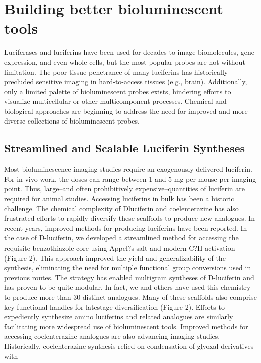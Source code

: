 \section{Building better bioluminescent tools}
Luciferases and luciferins have been used for decades to image
biomolecules, gene expression, and even whole cells, but the
most popular probes are not without limitation.\cite{RN26} The poor
tissue penetrance of many luciferins has historically precluded
sensitive imaging in hard-to-access tissues (e.g., brain).
Additionally, only a limited palette of bioluminescent probes
exists, hindering efforts to visualize multicellular or other
multicomponent processes. Chemical and biological approaches
are beginning to address the need for improved and
more diverse collections of bioluminescent probes.
\subsection*{Streamlined and Scalable Luciferin Syntheses} 
Most bioluminescence imaging studies require an exogenously
delivered luciferin. For in vivo work, the doses can range
between 1 and 5 mg per mouse per imaging point. Thus,
large--and often prohibitively expensive--quantities of luciferin
are required for animal studies. Accessing luciferins in bulk
has been a historic challenge. The chemical complexity of Dluciferin
and coelenterazine has also frustrated efforts to rapidly
diversify these scaffolds to produce new analogues.
In recent years, improved methods for producing luciferins
have been reported. In the case of D-luciferin, we developed a
streamlined method for accessing the requisite benzothiazole
core using Appel?s salt and modern C?H activation (Figure
2).\cite{McCutcheon:2012ixb} This approach improved the yield and generalizability of
the synthesis, eliminating the need for multiple functional
group conversions used in previous routes. The strategy has
enabled multigram syntheses of D-luciferin and has proven to
be quite modular. In fact, we and others have used this
chemistry to produce more than 30 distinct analogues.\cite{Woodroofe:2012vx} Many
of these scaffolds also comprise key functional handles for latestage
diversification (Figure 2). Efforts to expediently
synthesize amino luciferins\cite{Hauser:2016jt} and related analogues\cite{Anderson:2017hb} are similarly
facilitating more widespread use of bioluminescent tools.
Improved methods for accessing coelenterazine analogues
are also advancing imaging studies. Historically, coelenterazine
synthesis relied on condensation of glyoxal derivatives with
